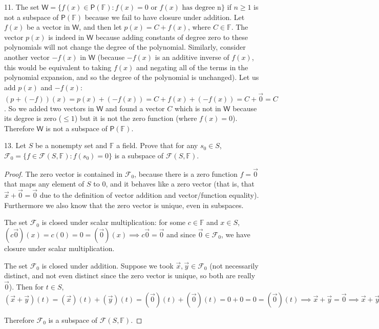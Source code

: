 \documentclass[11pt]{article}
\newcommand{\br}[1]{\left(#1\right)}
\newcommand{\cbr}[1]{\{#1\}}
\begin{document}
11. The set $\mathsf{W} = \cbr{f(x)\in\mathsf{P}(\mathbb{F}) : f(x) = 0 \text{ or } f(x) \text{ has degree n}}$ if $n\geq 1$ is not a subspace of $\mathsf{P}(\mathbb{F})$ because we fail to have closure under addition. Let $f(x)$ be a vector in $\mathsf{W}$, and then let $p(x) = C + f(x)$, where $C\in\mathbb{F}$. The vector $p(x)$ is indeed in $\mathsf{W}$ because adding constants of degree zero to these polynomials will not change the degree of the polynomial. Similarly, consider another vector $-f(x)$ in $\mathsf{W}$ (because $-f(x)$ is an additive inverse of $f(x)$, this would be equivalent to taking $f(x)$ and negating all of the terms in the polynomial expansion, and so the degree of the polynomial is unchanged). Let us add $p(x)$ and $-f(x)$: $\br{p+\br{-f}}(x) = p(x)+ \br{-f(x)} = C + f(x) + \br{-f(x)} = C+ \vec{0} = C$. So we added two vectors in $\mathsf{W}$ and found a vector $C$ which is not in $\mathsf{W}$ because its degree is zero ($\leq 1$) but it is not the zero function (where $f(x) = 0$). Therefore $\mathsf{W}$ is not a subspace of $\mathsf{P}(\mathbb{F})$.

13. Let $S$ be a nonempty set and $\mathbb{F}$ a field. Prove that for any $s_0\in S$, $\mathcal{F}_0 = \cbr{f\in\mathcal{F}\br{S,\mathbb{F}} : f(s_0) = 0}$ is a subspace of $\mathcal{F}\br{S,\mathbb{F}}$.

\begin{proof}
    The zero vector is contained in $\mathcal{F}_0$, because there is a zero function $f = \vec{0}$ that maps any element of $S$ to $0$, and it behaves like a zero vector (that is, that $\vec{x} + \vec{0} = \vec{0}$ due to the definition of vector addition and vector/function equality). Furthermore we also know that the zero vector is unique, even in subspaces.

    The set $\mathcal{F}_0$ is closed under scalar multiplication: for some $c\in\mathbb{F}$ and $x\in S$, $\br{c\vec{0}}(x) = c\br{0} = 0 = \br{\vec{0}}(x) \implies c\vec{0} = \vec{0}$ and since $\vec{0}\in\mathcal{F}_0$, we have closure under scalar multiplication.

    The set $\mathcal{F}_0$ is closed under addition. Suppose we took $\vec{x},\vec{y}\in\mathcal{F}_0$ (not necessarily distinct, and not even distinct since the zero vector is unique, so both are really $\vec{0}$). Then for $t\in S$, $\br{\vec{x} + \vec{y}}(t) = \br{\vec{x}}(t) + \br{\vec{y}}(t) = \br{\vec{0}}(t) + \br{\vec{0}}(t) = 0 + 0 = 0 = \br{\vec{0}}(t) \implies \vec{x} + \vec{y} = \vec{0} \implies \vec{x} + \vec{y} \in \mathcal{F}_0$

    Therefore $\mathcal{F}_0$ is a subspace of $\mathcal{F}\br{S,\mathbb{F}}$.
\end{proof}
\end{document}
